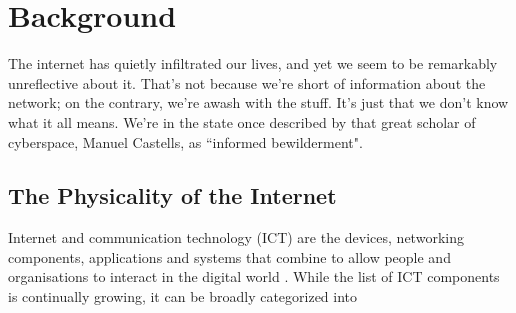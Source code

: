 \documentclass{article}
\begin{document}
\cleardoublepage
\section{Background} \label{SECTION_BACKGROUND}
 \begin{fquote} The internet has quietly infiltrated our lives, and yet we seem to be remarkably unreflective about it. That's not because we're short of information about the network; on the contrary, we're awash with the stuff. It's just that we don't know what it all means. We're in the state once described by that great scholar of cyberspace, Manuel Castells, as ``informed bewilderment".
 \end{fquote}

\subsection{The Physicality of the Internet}
Internet and communication technology (ICT) are the devices, networking components, applications and systems that combine to allow people and organisations to interact in the digital world \cite{techtarget2020ICT}. While the list of ICT components is continually growing, it can be broadly categorized into 
\end{document}
